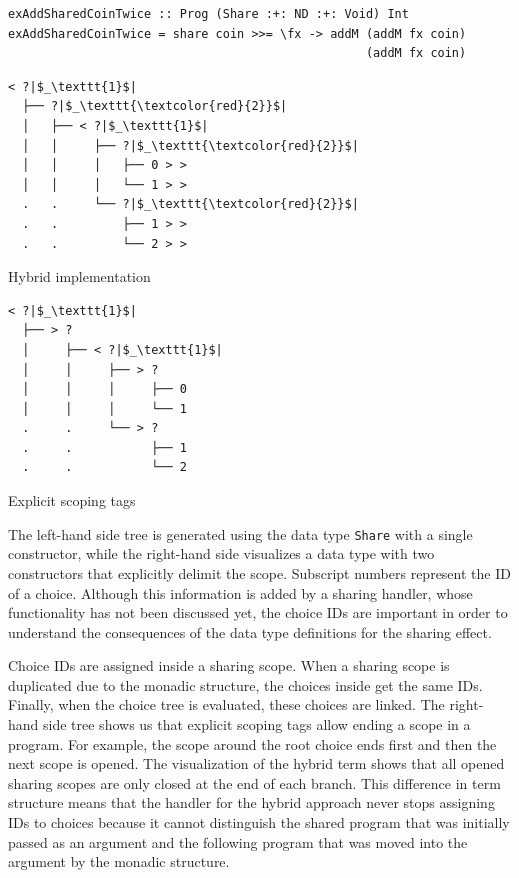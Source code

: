 \documentclass[a4paper, 11pt, fleqn, twoside]{scrreprt}
\newcommand{\hinl}[1]{\texttt{#1}}
\begin{document}
\begin{verbatim}
exAddSharedCoinTwice :: Prog (Share :+: ND :+: Void) Int
exAddSharedCoinTwice = share coin >>= \fx -> addM (addM fx coin) 
                                                  (addM fx coin)
\end{verbatim}

\vspace{0.32cm}

\begin{minipage}{.4 \linewidth}
\begin{verbatim}
< ?|$_\texttt{1}$|
  ├── ?|$_\texttt{\textcolor{red}{2}}$|
  │   ├── < ?|$_\texttt{1}$|
  │   │     ├── ?|$_\texttt{\textcolor{red}{2}}$|
  │   │     │   ├── 0 > >
  │   │     │   └── 1 > >
  .   .     └── ?|$_\texttt{\textcolor{red}{2}}$|
  .   .         ├── 1 > >
  .   .         └── 2 > >
\end{verbatim}
\begin{center}
Hybrid implementation
\end{center}
\end{minipage}
\hspace{.1 \linewidth}
\vline
\hspace{.1 \linewidth}
\begin{minipage}{.475 \linewidth}
\begin{verbatim}
< ?|$_\texttt{1}$|
  ├── > ? 
  │     ├── < ?|$_\texttt{1}$|
  │     │     ├── > ? 
  │     │     │     ├── 0
  │     │     │     └── 1
  .     .     └── > ? 
  .     .           ├── 1
  .     .           └── 2
\end{verbatim}
Explicit scoping tags
\end{minipage}

\vspace{0.32cm}

The left-hand side tree is generated using the data type \hinl{Share} with a single constructor, while the right-hand side visualizes a data type with two constructors that explicitly delimit the scope.
Subscript numbers represent the ID of a choice.
Although this information is added by a sharing handler, whose functionality has not been discussed yet, the choice IDs are important in order to understand the consequences of the data type definitions for the sharing effect.

Choice IDs are assigned inside a sharing scope.
When a sharing scope is duplicated due to the monadic structure, the choices inside get the same IDs.
Finally, when the choice tree is evaluated, these choices are linked.
The right-hand side tree shows us that explicit scoping tags allow ending a scope in a program.
For example, the scope around the root choice ends first and then the next scope is opened.
The visualization of the hybrid term shows that all opened sharing scopes are only closed at the end of each branch.
This difference in term structure means that the handler for the hybrid approach never stops assigning IDs to choices because it cannot distinguish the shared program that was initially passed as an argument and the following program that was moved into the argument by the monadic structure.
\end{document}
